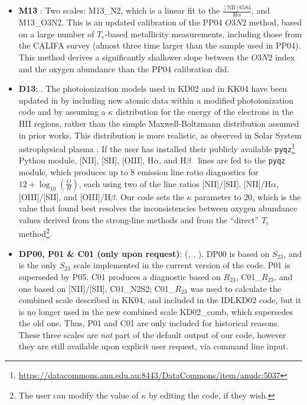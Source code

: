 \documentclass{emulateapj}
\newcommand{\oxab}{\ensuremath{12 + \log_{10}(\frac{O}{H})}}
\newcommand{\ha}{H$\alpha$}
\newcommand{\hb}{H$\beta$}
\begin{document}
\begin{itemize}
\item {\bf M13} \citep{marino13}: Two scales: M13\_N2, which is a linear fit to the $\frac{\mathrm{[NII]6584}}{\mathrm{H}\alpha}$, and  M13\_O3N2. This is an updated calibration of the PP04 $O3N2$ method, based on a large number of $T_e$-based metallicity measurements, including those from the CALIFA survey (almost three time larger than the sample used in PP04). This method derives a significantly shallower slope between the $O3N2$ index and the oxygen abundance than the PP04 calibration did.
\item {\bf D13}: \citep{dopita13}. The photoionization models used in KD02 and in KK04 have been updated in \citet{dopita13} by including new atomic data within a modified photoionization code and by assuming a $\kappa$ distribution for the energy of the electrons in the HII regions, rather than the simple Maxwell-Boltzmann distribution assumed in prior works. This distribution is more realistic, as observed in Solar System astrophysical plasma \citep{nicholls12}. If the user has installed their publicly available \verb=pyqz=\footnote{\url{https://datacommons.anu.edu.au:8443/DataCommons/item/anudc:5037}} Python module, [NII], [SII], [OIII], \ha, and \hb~ lines are fed to the \verb=pyqz= module, which produces up to 8 emission line ratio diagnostics for \oxab, each using two of the line ratios [NII]/[SII], [NII]/\ha, [OIII]/[SII], and [OIII]/\hb. Our code sets the $\kappa$ parameter to 20, which is the value that \citet{dopita13} found best resolves the inconsistencies between oxygen abundance values derived from the strong-line methods and from the ``direct'' $T_e$ method\footnote{The user can modify the value of $\kappa$ by editing the code, if they wish.}.
\item{\bf DP00, P01 \& C01 (only upon request)}: (\citealt{diaz00}, \citealt{pilyugin01}, \citealt{charlot01}). DP00 is based on $S_{23}$, and is the only $S_{23}$ scale implemented in the current version of the code. P01 is superseded by P05. C01 produces a diagnostic based on $R_{23}$, C01\_$R_{23}$, and one based on [NII]/[SII], C01\_N2S2; C01\_$R_{23}$ was used to calculate the combined scale described in KK04, and included in the IDLKD02 code, but it is no longer used in the new combined scale KD02\_comb, which supersedes the old one. Thus, P01 and C01 are only included for historical reasons. These three scales are \emph{not} part of the default output of our code, however they are still available upon explicit user request, via command line input.

\end{itemize}
\end{document}
